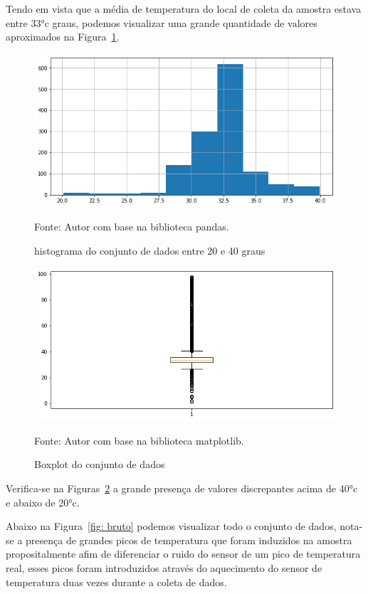Tendo em vista que a média de temperatura do local de coleta da amostra estava entre \ang{33}c graus, podemos visualizar uma grande quantidade de valores aproximados na Figura~\ref{fig: hist2}. 

\begin{figure}[H]
	\centering
	\includegraphics[width=15cm]{imagens/sensores/hist2.png}
	\caption{histograma do conjunto de dados entre 20 e 40 graus}
	Fonte: Autor com base na biblioteca pandas.
	\label{fig: hist2}
\end{figure}

\begin{figure}[H]
	\centering
	\includegraphics[width=15cm]{imagens/sensores/boxplot.png}
	\caption{Boxplot do conjunto de dados}
	Fonte: Autor com base na biblioteca matplotlib.
	\label{fig: boxplot}
\end{figure}

Verifica-se na Figuras~\ref{fig: boxplot} a grande presença de valores discrepantes acima de \ang{40}c e abaixo de \ang{20}c.

Abaixo na Figura~\ref{fig: bruto} podemos visualizar todo o conjunto de dados, nota-se a presença de grandes picos de temperatura que foram induzidos na amostra propositalmente afim de diferenciar o ruido do sensor de um pico de temperatura real, esses picos foram introduzidos através do aquecimento do sensor de temperatura duas vezes durante a coleta de dados.


